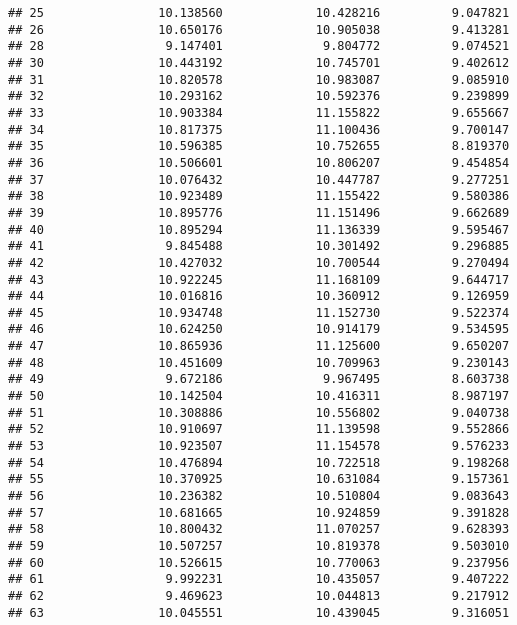 \documentclass[
]{article}
\begin{document}
\begin{verbatim}
## 25                10.138560             10.428216          9.047821
## 26                10.650176             10.905038          9.413281
## 28                 9.147401              9.804772          9.074521
## 30                10.443192             10.745701          9.402612
## 31                10.820578             10.983087          9.085910
## 32                10.293162             10.592376          9.239899
## 33                10.903384             11.155822          9.655667
## 34                10.817375             11.100436          9.700147
## 35                10.596385             10.752655          8.819370
## 36                10.506601             10.806207          9.454854
## 37                10.076432             10.447787          9.277251
## 38                10.923489             11.155422          9.580386
## 39                10.895776             11.151496          9.662689
## 40                10.895294             11.136339          9.595467
## 41                 9.845488             10.301492          9.296885
## 42                10.427032             10.700544          9.270494
## 43                10.922245             11.168109          9.644717
## 44                10.016816             10.360912          9.126959
## 45                10.934748             11.152730          9.522374
## 46                10.624250             10.914179          9.534595
## 47                10.865936             11.125600          9.650207
## 48                10.451609             10.709963          9.230143
## 49                 9.672186              9.967495          8.603738
## 50                10.142504             10.416311          8.987197
## 51                10.308886             10.556802          9.040738
## 52                10.910697             11.139598          9.552866
## 53                10.923507             11.154578          9.576233
## 54                10.476894             10.722518          9.198268
## 55                10.370925             10.631084          9.157361
## 56                10.236382             10.510804          9.083643
## 57                10.681665             10.924859          9.391828
## 58                10.800432             11.070257          9.628393
## 59                10.507257             10.819378          9.503010
## 60                10.526615             10.770063          9.237956
## 61                 9.992231             10.435057          9.407222
## 62                 9.469623             10.044813          9.217912
## 63                10.045551             10.439045          9.316051

\end{verbatim}
\end{document}
